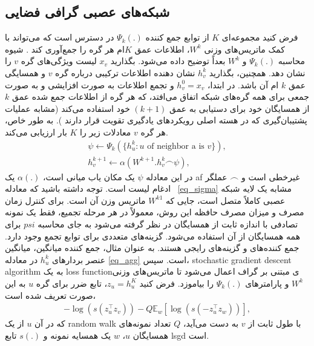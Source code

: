 \subsection{شبکه‌های عصبی گرافی فضایی}
فرض کنید مجموعه‌ای $ K $ از توابع جمع کننده $\Psi_{k}(.)$ در دسترس است که می‌تواند با کمک ماتریس‌های وزنی $W^k$، اطلاعات عمق $ K $ام هر گره را جمع‌آوری کند . شیوه محاسبه  $\Psi_{k}(.)$  و $W^k$  بعداً توضیح داده می‌شود.
بگذارید $ x_v $ لیست ویژگی‌های گره $ v $ را نشان دهد. همچنین، بگذارید  $ h_v ^ k $ نشان دهنده اطلاعات ترکیبی درباره گره $ v $ و همسایگی عمق $ k $ ام آن باشد. در ابتدا، $ h_v ^ 0 = x_v $ و تجمع اطلاعات به صورت افزایشی و به صورت جمعی برای همه گره‌های شبکه اتفاق می‌افتد، که هر گره از اطلاعات جمع شده عمق $ k $ از همسایگان خود برای دستیابی به عمق  $(k+1)$ خود استفاده می‌کند (مشابه عملیات پشتیبان‌گیری که در هسته اصلی رویکردهای یادگیری تقویت قرار دارند 
\cite {sutton2018reinforcement}
). به طور خاص، هر گره $ v $ معادلات زیر را $ K $ بار ارزیابی می‌کند.
\begin{gather}
\psi \gets \Psi_{k}(\{ h_u^k : u\text{ of neighbor a is }v \}), \label{eq_agg} \\
h_v^{k+1} \gets \alpha\left( W^{k+1} . h_v^k\frown\psi \right), \label{eq_sigma}
\end{gather}
در این معادله $\psi$ یک مکان یاب میانی است، $\alpha(.)$ یک \gls{af} غیرخطی است و $\frown$ عملگر ادغام لیست است. توجه داشته باشید که معادله ~\eqref{eq_sigma} مشابه یک لایه شبکه عصبی کاملاً متصل است، جایی که $ W ^ {k 1} $ ماتریس وزن آن است. برای کنترل زمان مصرف و میزان مصرف حافظه این روش، معمولاً در هر مرحله تجمیع، فقط یک نمونه تصادفی با اندازه ثابت از همسایگان در نظر گرفته می‌شود به جای محاسبه $ psi $ برای همه همسایگان از آن استفاده می‌شود. 
گزینه‌های متعددی برای توابع تجمع وجود دارد. جمع کننده‌های  و  گزینه‌های رایجی هستند. به عنوان مثال، جمع کننده میانگین، میانگین عنصر بردارهای $ h_u ^ {k} $ در معادله  \eqref {eq_agg} است.
سپس، \gls{stochastic gradient descent algorithm} به یک \gls{loss function}ی مبتنی بر گراف اعمال می‌شود تا ماتریس‌های وزنی $ W ^ k $ و پارامترهای $\Psi_{k}(.)$ را بیاموزد. فرض کنید  $ z_u = h_u ^ {K} $، تابع ضرر برای گره $ u $ به این صورت تعریف شده است،
\begin{gather}
-\log{(s(z_u^{\intercal}z_v))} - Q\mathbb{E}_{w}[\log{(s(-z_u^{\intercal}z_w))}],
\end{gather}
که در آن $ u $ از یک \gls{random walk} با طول ثابت از $ v $ به دست می‌آید، $ Q $ تعداد نمونه‌های همسایگان $ u $، $ w $ یک همسایه نمونه و $ s (.) $  تابع \gls{lsgd} است.

